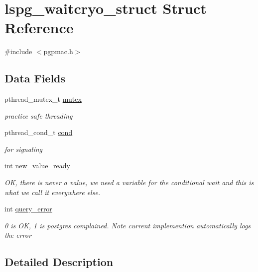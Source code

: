 \hypertarget{structlspg__waitcryo__struct}{\section{lspg\-\_\-waitcryo\-\_\-struct Struct Reference}
\label{structlspg__waitcryo__struct}
}


{\ttfamily \#include $<$pgpmac.\-h$>$}

\subsection*{Data Fields}
\begin{DoxyCompactItemize}
\item 
pthread\-\_\-mutex\-\_\-t \hyperlink{structlspg__waitcryo__struct_a62b50ead380fc8a6be35956eba384ba6}{mutex}
\begin{DoxyCompactList}\small\item\em practice safe threading \end{DoxyCompactList}\item 
pthread\-\_\-cond\-\_\-t \hyperlink{structlspg__waitcryo__struct_a54c275159d9f096e0d1884e64d099298}{cond}
\begin{DoxyCompactList}\small\item\em for signaling \end{DoxyCompactList}\item 
int \hyperlink{structlspg__waitcryo__struct_a97298b773fd8c1f2ef20159093a08246}{new\-\_\-value\-\_\-ready}
\begin{DoxyCompactList}\small\item\em O\-K, there is never a value, we need a variable for the conditional wait and this is what we call it everywhere else. \end{DoxyCompactList}\item 
int \hyperlink{structlspg__waitcryo__struct_a562f641a86142566aa67dc41f2676fb7}{query\-\_\-error}
\begin{DoxyCompactList}\small\item\em 0 is O\-K, 1 is postgres complained. Note current implemention automatically logs the error \end{DoxyCompactList}\end{DoxyCompactItemize}


\subsection{Detailed Description}


